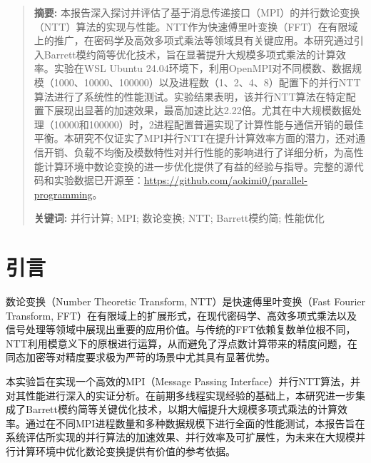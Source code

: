 \documentclass[a4paper]{article}
\begin{document}
\begin{abstract}
    \textbf{摘要: }本报告深入探讨并评估了基于消息传递接口（MPI）的并行数论变换（NTT）算法的实现与性能。NTT作为快速傅里叶变换（FFT）在有限域上的推广，在密码学及高效多项式乘法等领域具有关键应用。本研究通过引入Barrett模约简等优化技术，旨在显著提升大规模多项式乘法的计算效率。实验在WSL Ubuntu 24.04环境下，利用OpenMPI对不同模数、数据规模（1000、10000、100000）以及进程数（1、2、4、8）配置下的并行NTT算法进行了系统性的性能测试。实验结果表明，该并行NTT算法在特定配置下展现出显著的加速效果，最高加速比达2.22倍。尤其在中大规模数据处理（10000和100000）时，2进程配置普遍实现了计算性能与通信开销的最佳平衡。本研究不仅证实了MPI并行NTT在提升计算效率方面的潜力，还对通信开销、负载不均衡及模数特性对并行性能的影响进行了详细分析，为高性能计算环境中数论变换的进一步优化提供了有益的经验与指导。完整的源代码和实验数据已开源至：\url{https://github.com/aokimi0/parallel-programming}。

    \vspace{1em}
    \textbf{关键词: }并行计算; MPI; 数论变换; NTT; Barrett模约简; 性能优化
\end{abstract}

\renewcommand {\thefigure}{\thesection{}.\arabic{figure}}%
\renewcommand{\figurename}{图}
\renewcommand{\contentsname}{目录}  


\clearpage
\tableofcontents
\newpage

\section{引言}

数论变换（Number Theoretic Transform, NTT）是快速傅里叶变换（Fast Fourier Transform, FFT）在有限域上的扩展形式，在现代密码学、高效多项式乘法以及信号处理等领域中展现出重要的应用价值。与传统的FFT依赖复数单位根不同，NTT利用模意义下的原根进行运算，从而避免了浮点数计算带来的精度问题，在同态加密等对精度要求极为严苛的场景中尤其具有显著优势。

本实验旨在实现一个高效的MPI（Message Passing Interface）并行NTT算法，并对其性能进行深入的实证分析。在前期多线程实现经验的基础上，本研究进一步集成了Barrett模约简等关键优化技术，以期大幅提升大规模多项式乘法的计算效率。通过在不同MPI进程数量和多种数据规模下进行全面的性能测试，本报告旨在系统评估所实现的并行算法的加速效果、并行效率及可扩展性，为未来在大规模并行计算环境中优化数论变换提供有价值的参考依据。
\end{document}
